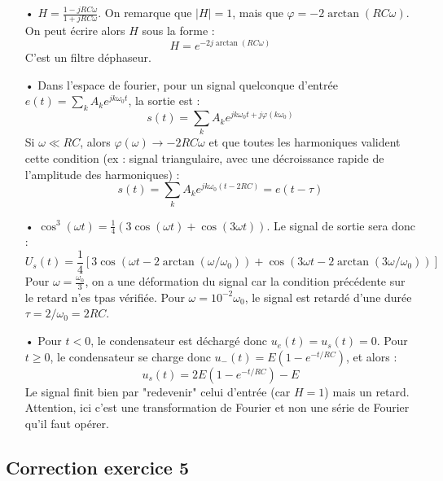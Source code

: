 \documentclass{report}
\begin{document}
\begin{itemize}
	\item[•]
	$H=\frac{1-jRC\omega}{1+jRC\omega}$. On remarque que $\mid H\mid=1$, mais que $\varphi=-2\arctan(RC\omega)$. On peut écrire alors $H$ sous la forme :
	\begin{equation}
		H=e^{-2j\arctan(RC\omega)}
	\end{equation}
C'est un filtre déphaseur.

	\item[•]
	Dans l'espace de fourier, pour un signal quelconque d'entrée $e(t)=\sum_k A_k e^{jk\omega_0 t}$, la sortie est :
	\begin{equation}
		s(t)=\sum_k A_k e^{jk\omega_0 t+j\varphi(k\omega_0)}
	\end{equation}
	Si $\omega\ll RC$, alors $\varphi(\omega)\longrightarrow-2RC\omega$ et que toutes les harmoniques valident cette condition (ex : signal triangulaire, avec une décroissance rapide de l'amplitude des harmoniques) :
	\begin{equation}
		s(t)=\sum_k A_k e^{jk\omega_0 (t-2RC)}=e(t-\tau)
	\end{equation}
	
	\item[•] $\cos^3(\omega t)=\frac{1}{4}(3\cos(\omega t) + \cos(3\omega t))$.
	Le signal de sortie sera donc : 
	\begin{equation}
	U_s(t) = \frac{1}{4}\left[ 3\cos(\omega t - 2\arctan(\omega/\omega_0)) + \cos(3\omega t - 2\arctan(3\omega/\omega_0))\right] 
	\end{equation}
	Pour $\omega = \frac{\omega_{0}}{3}$, on a une déformation du signal car la condition précédente sur le retard n'es tpas vérifiée. Pour $\omega=10^{-2}\omega_0$, le signal est retardé d'une durée $\tau=2/\omega_0=2RC$.
	
	\item[•] Pour $t<0$, le condensateur est déchargé donc $u_e(t)=u_s(t)=0$. Pour $t\geq0$, le condensateur se charge donc $u_-(t) = E(1-e^{-t/RC})$, et alors :
	\begin{equation}
		u_s(t)=2E(1-e^{-t/RC}) - E
	\end{equation}
	Le signal finit bien par "redevenir" celui d'entrée (car $H=1$) mais un retard. Attention, ici c'est une transformation de Fourier et non une série de Fourier qu'il faut opérer. 
	
\end{itemize}

\subsection*{Correction exercice 5}
\end{document}
